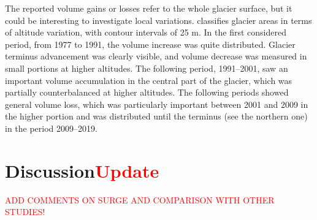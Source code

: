 {{The reported volume gains or losses refer to the whole glacier surface, but it could be interesting to investigate local variations. 
 classifies glacier areas in terms of altitude variation, with contour intervals of 25 m. 
In the first considered period, from 1977 to 1991, the volume increase was quite distributed. 
Glacier terminus advancement was clearly visible, and volume decrease was measured in small portions at higher altitudes. 
The following period, 1991–2001, saw an important volume accumulation in the central part of the glacier, which was partially counterbalanced at higher altitudes. 
The following periods showed general volume loss, which was particularly important between 2001 and 2009 in the higher portion and was distributed until the terminus (see the northern one) in the period 2009–2019.

\section{Discussion\textcolor{red}{Update}}\label{sec:2:discussion}

\textcolor{red}{ADD COMMENTS ON SURGE AND COMPARISON WITH OTHER STUDIES!}

}}
